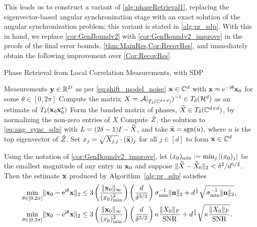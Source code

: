 This leads us to construct a variant of \cref{alg:phaseRetrieval1}, replacing the eigenvector-based angular synchronization stage with an exact solution of the angular synchronization problem; this variant is stated in \cref{alg:pr_sdp}.  With this in hand, we replace \cref{cor:GenBoundv2} with \cref{cor:GenBoundv2_improve} in the proofs of the final error bounds, \cref{thm:MainRes,Cor:RecovRes}, and immediately obtain the following improvement over \cref{Cor:RecovRes}.

\begin{algorithm}
\renewcommand{\algorithmicrequire}{\textbf{Input:}}
\renewcommand{\algorithmicensure}{\textbf{Output:}}
\caption{Phase Retrieval from Local Correlation Measurements, with SDP}
\label{alg:pr_sdp}
\begin{algorithmic}[1]
    \REQUIRE Measurements $\mathbf y\in \mathbb{R}^D$ as per \eqref{eq:shift_model_noise}
    \ENSURE ${\bf x} \in \mathbb{C}^d$ with ${\bf x} \approx \mathrm{e}^{-\mathrm{i} \theta} {\bf x}_0$ for some $\theta \in [0, 2 \pi]$ 
    \STATE Compute the matrix $X =\left.\mathcal{A}\right|_{T_\delta(\mathbb{C}^{d \times d})})^{-1} \in T_\delta(\mathcal{H}^d)$ as an estimate of $T_\delta(\mathbf x_0\mathbf x_0^*)$
    \STATE Form the banded matrix of phases, $\widetilde{X} \in T_\delta(\mathbb{C}^{d \times d})$, by normalizing the non-zero entries of $X$
    \STATE Compute $\hat{Z}$, the solution to \eqref{eq:ang_sync_sdp} with $L = (2 \delta - 1) I - \widetilde{X}$, and take $\widetilde{\mathbf x} = \operatorname{sgn}(u),$ where $u$ is the top eigenvector of $\hat{Z}$.
    \STATE Set $x_j = \sqrt{X_{j,j}} \cdot (\widetilde{\mathbf x})_j$ for all $j \in [d]$ to form $\mathbf x \in \mathbb{C}^d$
\end{algorithmic}
\end{algorithm}

\begin{corollary}\label{cor:main_improve}
Using the notation of \cref{cor:GenBoundv2_improve}, let $(x_0)_{\rm min} := \min_j |(x_0)_j|$ be the smallest magnitude of any entry in $\mathbf x_0$ and suppose $\lVert\widetilde{X} - \widetilde{X}_0\rVert_2 < \delta^2 / d^{5/2}$.  Then the estimate $\mathbf x$ produced by Algorithm~\ref{alg:pr_sdp} satisfies 
\begin{equation}
  \begin{aligned}
    \min_{\theta \in [0, 2\pi]} \lVert\mathbf x_0 - \mathrm{e}^{\mathrm{i} \theta} \mathbf x\rVert_2 &\leq 3 \left( \frac{\lVert\mathbf x_0\rVert_{\infty}}{(x_0)^2_{\rm min}} \right) \left(\frac{d}{\delta^{3/2}} \right) \sigma_{\min}^{-1}\lVert\mathbf n\rVert_2 + d^{\frac{1}{4}} \sqrt{\sigma_{\min}^{-1}\lVert\mathbf n\rVert_2}, \\    
    \min_{\theta \in [0, 2\pi]} \lVert\mathbf x_0 - \mathrm{e}^{\mathrm{i} \theta} \mathbf x\rVert_2 &\leq 3 \left( \frac{\lVert\mathbf x_0\rVert_{\infty}}{(x_0)^2_{\rm min}} \right) \left(\frac{d}{\delta^{3/2}} \right) \kappa \frac{\lVert X_0\rVert_F}{\operatorname{SNR}} + d^{\frac{1}{4}} \sqrt{\kappa \frac{\lVert X_0\rVert_F}{\operatorname{SNR}}}.
  \end{aligned}
  \label{eq:main_improve}
\end{equation}
\end{corollary}

